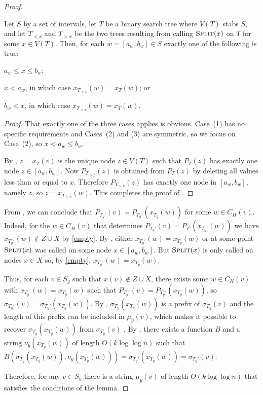 \documentclass[kpfonts]{patmorin}
\let\le\leqslant
\begin{document}
\begin{proof}
  \begin{clm}
    Let $S$ by a set of intervals, let $T$ be a binary search tree where $V(T)$ stabs $S$, and let $T_{<x}$ and $T_{>x}$ be the two trees resulting from calling $\textsc{Split}(x)$ on $T$ for some $x\in V(T)$.  Then, for each $w=[a_w,b_w]\in S$ exactly one of the following is true:
    \begin{compactenum}
      \item $a_w\le x\le b_w$;
      \item $x< a_w$, in which case $x_{T_{>x}}(w)=x_T(w)$; or
      \item $b_w < x$, in which case $x_{T_{<x}}(w)=x_T(w)$.
    \end{compactenum}
  \end{clm}

  \begin{proof}
    That exactly one of the three cases applies is obvious.  Case~(1) has no specific requirements and Cases~(2) and (3) are symmetric, so we focus on Case~(2), so $x < a_w\le b_w$.

    By , $z=x_T(v)$ is the unique node $z\in V(T)$ such that $P_T(z)$ has exactly one node $z\in [a_w,b_w]$.  Now $P_{T_{>x}}(z)$ is obtained from $P_T(z)$ by deleting all values less than or equal to $x$. Therefore $P_{T_{>x}}(z)$ has exactly one node in $[a_w,b_w]$, namely $z$, so $z=x_{T_{>x}}(w)$.  This completes the proof of .
  \end{proof}

  From , we can conclude that $P_{T_y'}(v)=P_{T_y'}(x_{T_y}(w))$ for some $w\in C_H(v)$.  Indeed, for the $w\in C_H(v)$ that determines $P_{T_y'}(v)=P_{T'}(x_{T_y'}(w))$ we have $x_{T_y'}(w)\not\in Z\cup X$ by \eqref{empty}. By , either $x_{T_y'}(w)=x_{T_y}(w)$ or at some point $\textsc{Split}(x)$ was called on some node $x\in[a_w,b_w]$.  But $\textsc{Split}(x)$ is only called on nodes $x\in X$ so, by \eqref{empty}, $x_{T_y'}(w)=x_{T_y}(w)$.

  Thus, for each $v\in S_y$ such that $x(v)\not\in Z\cup X$, there exists some $w\in C_H(v)$ with $x_{T_y'}(w)=x_{T_y}(w)$ such that $P_{T_y'}(v)=P_{T_y'}(x_{T_y}(w))$, so $\sigma_{T_y'}(v)=\sigma_{T_y'}(x_{T_y}(w))$.  By , $\sigma_{T_y}(x_{T_y}(w))$ is a prefix of $\sigma_{T_y}(v)$ and the length of this prefix can be included in $\mu_y(v)$, which makes it possible to recover $\sigma_{T_y}(x_{T_y}(w))$ from $\sigma_{T_y}(v)$ .  By , there exists a function $B$ and a string $\nu_y(x_{T_y}(w))$ of length $O(k\log\log n)$ such that $B(\sigma_{T_y}(x_{T_y}(w)), \nu_y(x_{T_y}(w))) = \sigma_{T_y'}(x_{T_y}(w)) = \sigma_{T_y'}(v)$.

  Therefore, for any $v\in S_y$ there is a string $\mu_y(v)$ of length $O(k\log\log n)$ that satisfies the conditions of the lemma.
\end{proof}
\end{document}
